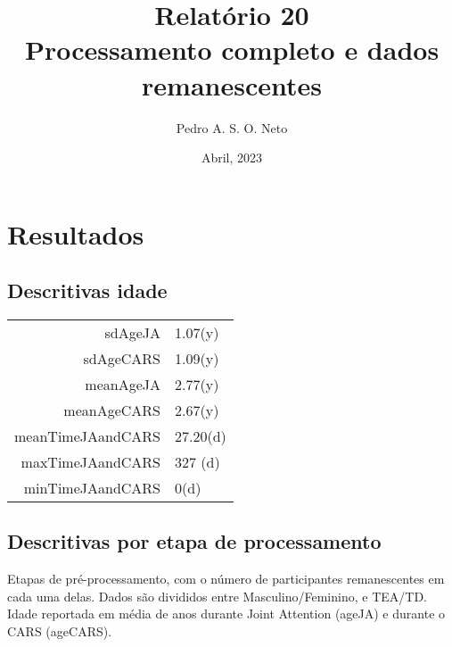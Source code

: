 \documentclass{article}
\title{Relatório 20 \\ Processamento completo e dados remanescentes}
\author{Pedro A. S. O. Neto}
\date{Abril, 2023}
\begin{document}
\maketitle

\section{Resultados}

\subsection{Descritivas idade}

\begin{table}[ht]
\centering
\begin{tabular}{rl}
  \hline
  \hline
  sdAgeJA & 1.07(y) \\ 
  sdAgeCARS & 1.09(y) \\ 
  meanAgeJA & 2.77(y) \\ 
  meanAgeCARS & 2.67(y) \\ 
  meanTimeJAandCARS & 27.20(d) \\ 
  maxTimeJAandCARS & 327 (d) \\ 
  minTimeJAandCARS & 0(d) \\ 
   \hline
\end{tabular}
\end{table}

\subsection{Descritivas por etapa de processamento}
Etapas de pré-processamento, com o número de participantes remanescentes em cada uma delas. Dados são divididos entre Masculino/Feminino, e TEA/TD. Idade reportada em média de anos durante Joint Attention (ageJA) e durante o CARS (ageCARS).
\end{document}

